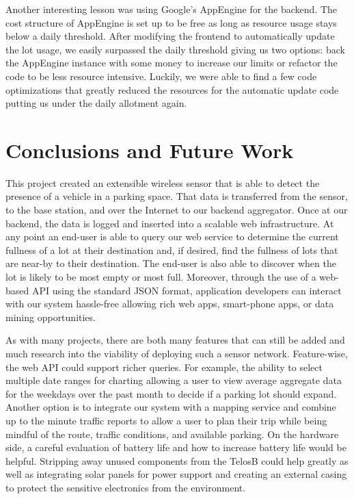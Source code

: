 \documentclass{acm_proc}
\begin{document}
Another interesting lesson was using Google's AppEngine for the backend.
The cost structure of AppEngine is set up to be free as long as resource
usage stays below a daily threshold.
After modifying the frontend to automatically update the lot usage, we
easily surpassed the daily threshold giving us two options: back the
AppEngine instance with some money to increase our limits or refactor the
code to be less resource intensive.
Luckily, we were able to find a few code optimizations that greatly reduced
the resources for the automatic update code putting us under the daily
allotment again.

\section{Conclusions and Future Work}\label{sec:conclusions}

This project created an extensible wireless sensor that is able to detect
the presence of a vehicle in a parking space.
That data is transferred from the sensor, to the base station, and over the
Internet to our backend aggregator.
Once at our backend, the data is logged and inserted into a scalable web
infrastructure.
At any point an end-user is able to query our web service to determine the
current fullness of a lot at their destination and, if desired, find the
fullness of lots that are near-by to their destination.
The end-user is also able to discover when the lot is likely to be most
empty or most full.
Moreover, through the use of a web-based API using the standard JSON
format, application developers can interact with our system hassle-free
allowing rich web apps, smart-phone apps, or data mining opportunities.

As with many projects, there are both many features that can still be added
and much research into the viability of deploying such a sensor network.
Feature-wise, the web API could support richer queries.
For example, the ability to select multiple date ranges for charting
allowing a user to view average aggregate data for the weekdays over the
past month to decide if a parking lot should expand.
Another option is to integrate our system with a mapping service and
combine up to the minute traffic reports to allow a user to plan their trip
while being mindful of the route, traffic conditions, and available
parking.
On the hardware side, a careful evaluation of battery life and how to
increase battery life would be helpful.
Stripping away unused components from the TelosB could help greatly as well
as integrating solar panels for power support and creating an external
casing to protect the sensitive electronics from the environment.



\end{document}
